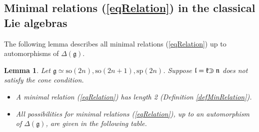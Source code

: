 \documentclass[12pt]{report}
\newtheorem{lemma}[theo]{Lemma}
\newcommand{\kk}{\mathfrak{k}}
\newcommand{\nn}{\mathfrak{n}}
\newcommand{\gG}{\mathfrak{g}}
\newcommand{\lL}{\mathfrak{l}}
\newcommand{\refeq}[1]{(\ref{#1})}
\newcommand{\sP}{\mathrm{sp}}
\newcommand{\so}{\mathrm{so}}
\def\crplus{\hbox{$\supset${\raise1.05pt\hbox{\kern -0.60em ${\scriptscriptstyle +}$}}\ }}
\begin{document}
\subsection{Minimal relations \refeq{eqRelation} in the classical Lie algebras}
The following lemma describes all minimal relations (\ref{eqRelation}) up to automorphisms of $\Delta(\gG)$.
\begin{lemma}\label{leBigTedious}
Let $\gG\simeq\so(2n),\so(2n+1),\sP(2n)$. Suppose $\lL=\kk\crplus\nn$ does not satisfy the cone condition. 
\begin{itemize}
\item A minimal relation \refeq{eqRelation} has length 2 (Definition \ref{defMinRelation}).
\item All possibilities for minimal relations \refeq{eqRelation}, up to an automorphism of $\Delta(\gG)$, are given in the following table.
\end{itemize}
\end{lemma}
\end{document}
